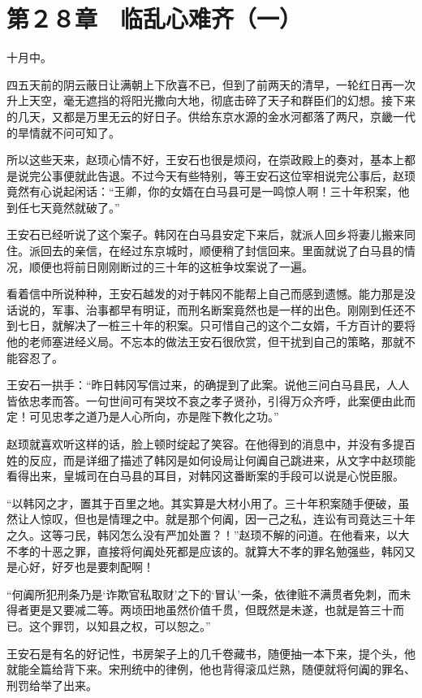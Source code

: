 \section{第２８章　临乱心难齐（一）}

十月中。

四五天前的阴云蔽日让满朝上下欣喜不已，但到了前两天的清早，一轮红日再一次升上天空，毫无遮挡的将阳光撒向大地，彻底击碎了天子和群臣们的幻想。接下来的几天，又都是万里无云的好日子。供给东京水源的金水河都落了两尺，京畿一代的旱情就不问可知了。

所以这些天来，赵顼心情不好，王安石也很是烦闷，在崇政殿上的奏对，基本上都是说完公事便就此告退。不过今天有些特别，等王安石这位宰相说完公事后，赵顼竟然有心说起闲话：“王卿，你的女婿在白马县可是一鸣惊人啊！三十年积案，他到任七天竟然就破了。”

王安石已经听说了这个案子。韩冈在白马县安定下来后，就派人回乡将妻儿搬来同住。派回去的亲信，在经过东京城时，顺便稍了封信回来。里面就说了白马县的情况，顺便也将前日刚刚断过的三十年的这桩争坟案说了一遍。

看着信中所说种种，王安石越发的对于韩冈不能帮上自己而感到遗憾。能力那是没话说的，军事、治事都早有明证，而刑名断案竟然也是一样的出色。刚刚到任还不到七日，就解决了一桩三十年的积案。只可惜自己的这个二女婿，千方百计的要将他的老师塞进经义局。不忘本的做法王安石很欣赏，但干扰到自己的策略，那就不能容忍了。

王安石一拱手：“昨日韩冈写信过来，的确提到了此案。说他三问白马县民，人人皆依忠孝而答。一句世间可有哭坟不哀之孝子贤孙，引得万众齐呼，此案便由此而定！可见忠孝之道乃是人心所向，亦是陛下教化之功。”

赵顼就喜欢听这样的话，脸上顿时绽起了笑容。在他得到的消息中，并没有多提百姓的反应，而是详细了描述了韩冈是如何设局让何阗自己跳进来，从文字中赵顼能看得出来，皇城司在白马县的耳目，对韩冈这番断案的手段可以说是心悦臣服。

“以韩冈之才，置其于百里之地。其实算是大材小用了。三十年积案随手便破，虽然让人惊叹，但也是情理之中。就是那个何阗，因一己之私，连讼有司竟达三十年之久。这等刁民，韩冈怎么没有严加处置？！”赵顼不解的问道。在他看来，以大不孝的十恶之罪，直接将何阗处死都是应该的。就算大不孝的罪名勉强些，韩冈又是心好，好歹也是要刺配啊！

“何阗所犯刑条乃是‘诈欺官私取财’之下的‘冒认’一条，依律赃不满贯者免刺，而未得者更是又要减二等。两顷田地虽然价值千贯，但既然是未遂，也就是笞三十而已。这个罪罚，以知县之权，可以恕之。”

王安石是有名的好记性，书房架子上的几千卷藏书，随便抽一本下来，提个头，他就能全篇给背下来。宋刑统中的律例，他也背得滚瓜烂熟，随便就将何阗的罪名、刑罚给举了出来。

